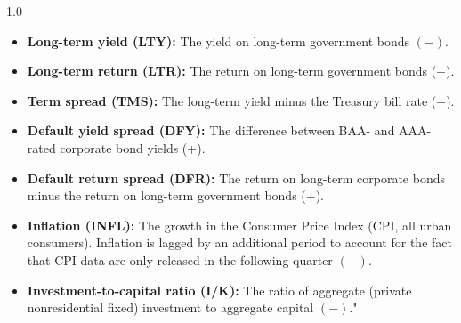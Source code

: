 \documentclass[a4paper,11pt]{article}
\begin{document}
\begin{spacing}{1.0}
\begin{itemize}[noitemsep, topsep=0pt]
\item \textbf{Long-term yield (LTY):} The yield on long-term government bonds $(-)$.

\item \textbf{Long-term return (LTR):} The return on long-term government bonds (+).

\item \textbf{Term spread (TMS):} The long-term yield minus the Treasury bill rate (+).

\item \textbf{Default yield spread (DFY):} The difference between BAA- and AAA-rated corporate bond yields (+).

\item \textbf{Default return spread (DFR):} The return on long-term corporate bonds minus the return on long-term government bonds (+).

\item \textbf{Inflation (INFL):} The growth in the Consumer Price Index (CPI, all urban consumers). Inflation is lagged by an additional period to account for the fact that CPI data are only released in the following quarter $(-)$.

\item \textbf{Investment-to-capital ratio (I/K):} The ratio of aggregate (private nonresidential fixed) investment to aggregate capital $(-)$."


\end{itemize}
\end{spacing}
\end{document}
